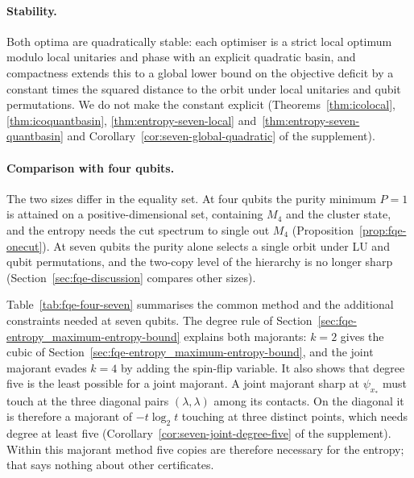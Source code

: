 \paragraph{Stability.} Both optima are quadratically stable: each optimiser is a strict local optimum modulo local
unitaries and phase with an explicit quadratic basin, and compactness extends this to a global lower bound on the objective deficit by a constant
times the squared distance to the orbit under local unitaries and qubit permutations. We do not make the constant explicit (Theorems~\ref{thm:icolocal},
\ref{thm:icoquantbasin}, \ref{thm:entropy-seven-local} and~\ref{thm:entropy-seven-quantbasin} and
Corollary~\ref{cor:seven-global-quadratic} of the supplement).

\paragraph{Comparison with four qubits.} The two sizes differ in the equality set. At four qubits the purity minimum $P=1$ is attained on a positive-dimensional
set, containing $M_4$ and the cluster state, and the entropy needs the cut spectrum to single out $M_4$
(Proposition~\ref{prop:fqe-onecut}). At seven qubits the purity alone selects a single orbit under LU and qubit permutations,
and the two-copy level of the hierarchy is no longer sharp (Section~\ref{sec:fqe-discussion} compares other sizes).

Table~\ref{tab:fqe-four-seven} summarises the common method and the additional constraints needed at seven qubits. The degree rule of
Section~\ref{sec:fqe-entropy_maximum-entropy-bound} explains both majorants: $k=2$ gives the cubic of Section~\ref{sec:fqe-entropy_maximum-entropy-bound}, and the joint
majorant evades $k=4$ by adding the spin-flip variable. It also shows that degree five is the least possible for a joint
majorant. A joint majorant sharp at $\psi_{x_*}$ must touch at the three diagonal pairs $(\lambda,\lambda)$ among its
contacts. On the diagonal it is therefore a majorant of $-t\log_2t$ touching at three distinct points, which needs degree at least five
(Corollary~\ref{cor:seven-joint-degree-five} of the supplement). Within this majorant method five copies are therefore necessary for the entropy; that says nothing about other certificates.

